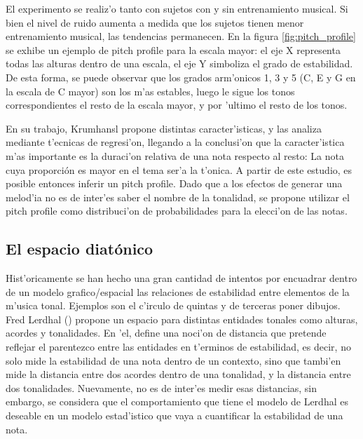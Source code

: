 El experimento se realiz'o tanto con sujetos con y sin entrenamiento musical. Si bien el nivel de ruido aumenta a medida que los sujetos 
tienen menor entrenamiento musical, las tendencias permanecen. En la figura \ref{fig:pitch_profile} se exhibe un ejemplo de pitch profile para la escala mayor: 
el eje X representa todas las alturas dentro de una escala, el eje Y simboliza el grado de estabilidad. De esta forma, se puede observar que los grados arm'onicos
1, 3 y 5 (C, E y G en la escala de C mayor) son los m'as estables, luego le sigue los tonos correspondientes el resto de la escala mayor, y por 'ultimo el resto de los 
tonos.


\begin{imagen}
    \width{10cm}
\end{imagen}


En su trabajo, Krumhansl propone distintas caracter'isticas, y las analiza mediante t'ecnicas de regresi'on, llegando a la conclusi'on que la
caracter'istica m'as importante es la duraci'on relativa de una nota respecto al resto: La nota cuya proporci\'on es mayor en el tema ser'a la t'onica. A partir de este 
estudio, es posible entonces inferir un pitch profile. Dado que a los efectos de generar una melod'ia no es de inter'es saber el nombre de la tonalidad, se propone 
utilizar el pitch profile como distribuci'on de probabilidades para la elecci'on de las notas.

\subsection{El espacio diat\'onico}
Hist'oricamente se han hecho una gran cantidad de intentos por encuadrar dentro de un modelo grafico/espacial las relaciones de estabilidad entre elementos de la m'usica
tonal. Ejemplos son el c'irculo de quintas y de terceras \alert{poner dibujos}. Fred Lerdhal (\cita) propone un espacio para distintas entidades tonales como alturas, 
acordes y tonalidades. En 'el, define una noci'on de distancia que pretende reflejar el parentezco entre las entidades en t'erminos de estabilidad, es decir, no solo 
mide la estabilidad de una nota dentro de un contexto, sino que tambi'en mide la distancia entre dos acordes dentro de una tonalidad, y la distancia entre dos tonalidades. 
Nuevamente, no es de inter'es medir esas distancias, sin embargo, se considera que el comportamiento que tiene el modelo de Lerdhal es deseable en un modelo estad'istico
que vaya a cuantificar la estabilidad de una nota.

